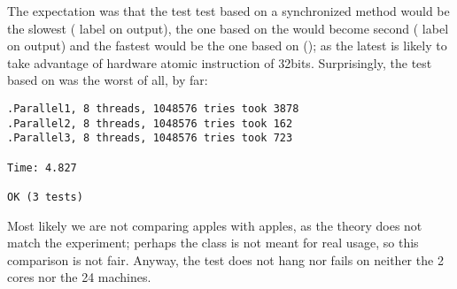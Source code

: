 The expectation was that the test test based on a synchronized method
would be the slowest ( label on output), the one based on
the  would become second ( label on
output) and the fastest would be the one based on 
(); as the latest is likely to take advantage of hardware
atomic instruction of 32bits. Surprisingly, the test based on
 was the worst of all, by far: \\

\begin{verbatim}
.Parallel1, 8 threads, 1048576 tries took 3878
.Parallel2, 8 threads, 1048576 tries took 162
.Parallel3, 8 threads, 1048576 tries took 723

Time: 4.827

OK (3 tests)
\end{verbatim}
\hfill

Most likely we are not comparing apples with apples, as the theory
does not match the experiment; perhaps the  class is
not meant for real usage, so this comparison is not fair. Anyway, the
test does not hang nor fails on neither the 2 cores nor the 24 machines.





